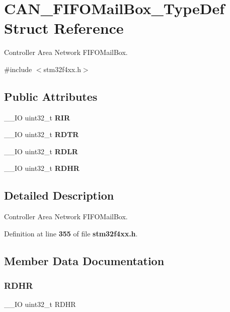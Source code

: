 \section{C\+A\+N\+\_\+\+F\+I\+F\+O\+Mail\+Box\+\_\+\+Type\+Def Struct Reference}
\label{structCAN__FIFOMailBox__TypeDef}


Controller Area Network F\+I\+F\+O\+Mail\+Box.  




{\ttfamily \#include $<$stm32f4xx.\+h$>$}

\subsection*{Public Attributes}
\begin{DoxyCompactItemize}
\item 
\+\_\+\+\_\+\+IO uint32\+\_\+t \textbf{ R\+IR}
\item 
\+\_\+\+\_\+\+IO uint32\+\_\+t \textbf{ R\+D\+TR}
\item 
\+\_\+\+\_\+\+IO uint32\+\_\+t \textbf{ R\+D\+LR}
\item 
\+\_\+\+\_\+\+IO uint32\+\_\+t \textbf{ R\+D\+HR}
\end{DoxyCompactItemize}


\subsection{Detailed Description}
Controller Area Network F\+I\+F\+O\+Mail\+Box. 

Definition at line \textbf{ 355} of file \textbf{ stm32f4xx.\+h}.



\subsection{Member Data Documentation}
\mbox{\label{structCAN__FIFOMailBox__TypeDef_a7f11f42ba9d3bc5cd4a4f5ea0214608e}} 
\subsubsection{R\+D\+HR}
{\footnotesize\ttfamily \+\_\+\+\_\+\+IO uint32\+\_\+t R\+D\+HR}

